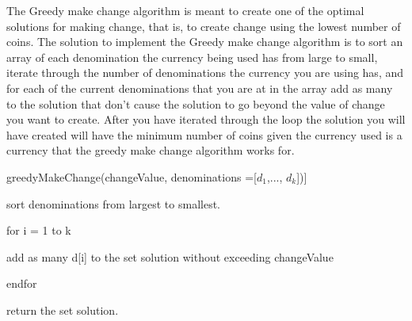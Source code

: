 \documentclass{article}
\begin{document}
The Greedy make change algorithm is meant to create one of the optimal solutions for making change, that is, to create change using the lowest number of coins. The solution to implement the Greedy make change algorithm is to sort an array of each denomination the currency being used has from large to small, iterate through the number of denominations the currency you are using has, and for each of the current denominations that you are at in the array add as many to the solution that don't cause the solution to go beyond the value of change you want to create. After you have iterated through the loop the solution you will have created will have the minimum number of coins given the currency used is a currency that the greedy make change algorithm works for. 


greedyMakeChange(changeValue, denominations ={[$d_1$,..., $d_k$]})]

sort denominations from largest to smallest.
 
for i = 1 to k

\quad 	add as many d{[i]} to the set solution without exceeding changeValue

endfor

return the set solution.
\end{document}
